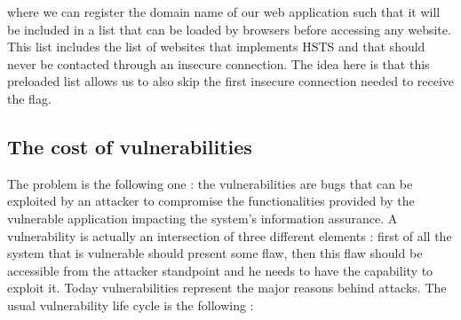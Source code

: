 where we can register the domain name of our web application such that it will be included in a list that can be loaded by browsers before accessing any website. This list includes the list of websites that implements HSTS and that should never be contacted through an insecure connection. The idea here is that this preloaded list allows us to also skip the first insecure connection needed to receive the flag.

\subsection{The cost of vulnerabilities}
The problem is the following one : the vulnerabilities are bugs that can be exploited by an attacker to compromise the functionalities provided by the vulnerable application impacting the system's information assurance. A vulnerability is actually an intersection of three different elements : first of all the system that is vulnerable should present some flaw, then this flaw should be accessible from the attacker standpoint and he needs to have the capability to exploit it. Today vulnerabilities represent the major reasons behind attacks. The usual vulnerability life cycle is the following :
